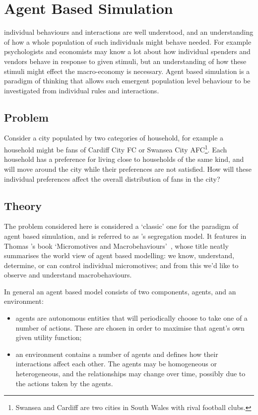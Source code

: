 \chapter[Agent Based Simulation]{Agent Based Simulation}\label{chp:agent_based_simulation}

 individual behaviours and
interactions are well understood,
and an understanding of how a whole population of such
individuals might behave needed. For example psychologists and economists may know a
lot about how individual spenders and vendors behave in response to given
stimuli, but an understanding of how these stimuli might effect the
macro-economy is necessary.
Agent based simulation is a paradigm of
thinking that allows such emergent population level behaviour to be investigated
from individual rules and interactions.

\section{Problem}\label{sec:agent_based_simulation_problem}

Consider a city populated by two categories of household, for example a household
might be fans of Cardiff City FC or Swansea City AFC\footnote{Swansea and
Cardiff are two cities in South Wales with rival football clubs.}.
Each household has a
preference for living close to households of the same kind, and will move
around the city while their preferences are not satisfied.
How will these individual preferences affect the overall distribution of fans in
the city?

\section{Theory}\label{sec:agent_based_simulation_theory}

The problem considered here is considered a `classic' one for the paradigm of
agent based simulation, and is referred to as 's segregation model.
It features in Thomas 's book `Micromotives and
Macrobehaviours'~\cite{schelling2006micromotives}, whose
title neatly summarises the world view of agent based modelling: we know,
understand, determine, or can control individual micromotives; and from this
we'd like to observe and understand macrobehaviours.

In general an agent based model consists of two components, agents, and an
environment:

\begin{itemize}
    \item agents are autonomous entities that will periodically choose to take one
        of a number of actions.
        These are chosen in order to maximise that agent's own given utility
        function;
    \item an environment contains a number of agents and defines how their
        interactions affect each other.
        The agents may be homogeneous or heterogeneous, and the
        relationships may change over time, possibly due to the actions taken
        by the agents.
\end{itemize}

